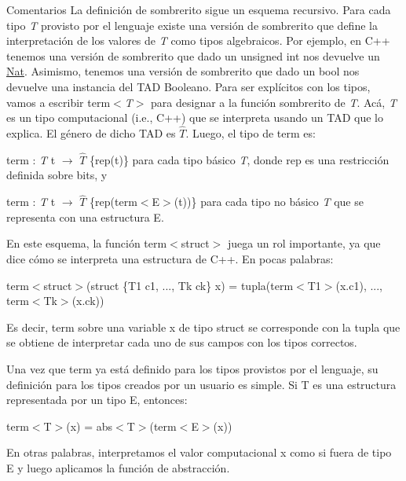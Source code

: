 \begin{DoxyRemark}{Comentarios}
La definición de sombrerito sigue un esquema recursivo. Para cada tipo {\itshape T} provisto por el lenguaje existe una versión de sombrerito que define la interpretación de los valores de {\itshape T} como tipos algebraicos. Por ejemplo, en C++ tenemos una versión de sombrerito que dado un unsigned int nos devuelve un \hyperlink{classNat}{Nat}. Asimismo, tenemos una versión de sombrerito que dado un bool nos devuelve una instancia del T\+AD Booleano. Para ser explícitos con los tipos, vamos a escribir term$<${\itshape T$>$} para designar a la función sombrerito de {\itshape T}. Acá, {\itshape T} es un tipo computacional (i.\+e., C++) que se interpreta usando un T\+AD que lo explica. El género de dicho T\+AD es $\widehat{T}$. Luego, el tipo de term es\+:
\begin{DoxyEnumerate}
\item term \+: {\itshape T} t $\to$ $\widehat{T}$ \{rep(t)\} para cada tipo básico {\itshape T}, donde rep es una restricción definida sobre bits, y
\item term \+: {\itshape T} t $\to$ $\widehat{T}$ \{rep(term$<$\+E$>$(t))\} para cada tipo no básico {\itshape T} que se representa con una estructura E.
\end{DoxyEnumerate}

En este esquema, la función term$<$struct$>$ juega un rol importante, ya que dice cómo se interpreta una estructura de C++. En pocas palabras\+:
\begin{DoxyItemize}
\item term$<$struct$>$(struct \{T1 c1, ..., Tk ck\} x) = tupla(term$<$\+T1$>$(x.\+c1), ..., term$<$\+Tk$>$(x.\+ck))
\end{DoxyItemize}

Es decir, term sobre una variable x de tipo struct se corresponde con la tupla que se obtiene de interpretar cada uno de sus campos con los tipos correctos.

Una vez que term ya está definido para los tipos provistos por el lenguaje, su definición para los tipos creados por un usuario es simple. Si T es una estructura representada por un tipo E, entonces\+:
\begin{DoxyItemize}
\item term$<$\+T$>$(x) = abs$<$\+T$>$(term$<$\+E$>$(x))
\end{DoxyItemize}

En otras palabras, interpretamos el valor computacional x como si fuera de tipo E y luego aplicamos la función de abstracción. 
\end{DoxyRemark}


